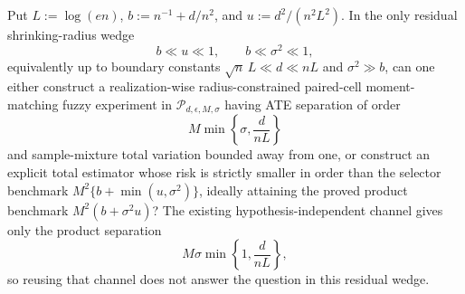 Put \(L:=\log(en)\), \(b:=n^{-1}+d/n^2\), and \(u:=d^2/(n^2L^2)\).  In the only residual shrinking-radius wedge
\[
 b\ll u\ll1,
 \qquad
 b\ll\sigma^2\ll1,
\]
equivalently up to boundary constants \(\sqrt n\,L\ll d\ll nL\) and \(\sigma^2\gg b\), can one either construct a realization-wise radius-constrained paired-cell moment-matching fuzzy experiment in \(\mathcal P_{d,\epsilon,M,\sigma}\) having ATE separation of order
\[
 M\min\left\{\sigma,\frac{d}{nL}\right\}
\]
and sample-mixture total variation bounded away from one, or construct an explicit total estimator whose risk is strictly smaller in order than the selector benchmark \(M^2\{b+\min(u,\sigma^2)\}\), ideally attaining the proved product benchmark \(M^2(b+\sigma^2u)\)?  The existing hypothesis-independent channel gives only the product separation
\[
 M\sigma\min\left\{1,\frac{d}{nL}\right\},
\]
so reusing that channel does not answer the question in this residual wedge.